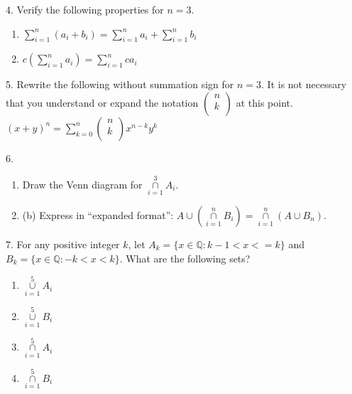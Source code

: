 \documentclass[10pt,]{book}
\theoremstyle{plain}
\theoremstyle{definition}
\begin{document}
\begin{exercisegroup}
\par\smallskip
\item[4.]\hypertarget{exercise-35}{}   Verify the following properties for \(n = 3\).   
\leavevmode%
\begin{enumerate}[label=(\alph*)]
\item\hypertarget{li-186}{}   \(\sum _{i=1}^n \left(a_i+ b_i\right) =\sum _{i=1}^n a_i +\sum _{i=1}^n  b_i\) \item\hypertarget{li-187}{}    \(c\left(\sum _{i=1}^n a_i\right) = \sum _{i=1}^n c a_i\)\end{enumerate}
\par\smallskip
\item[5.]\hypertarget{exercise-36}{} 
 Rewrite the following without summation sign for \(n = 3\). It is not necessary that you understand or expand the notation \(\left(
\begin{array}{c}
 n \\
 k \\
\end{array}
\right)\) at this point. 
  \((x + y)^n= \sum _{k=0}^n \left(
\begin{array}{c}
 n \\
 k \\
\end{array}
\right)x^{n-k}y^k\)\par\smallskip
\item[6.]\hypertarget{exercise-37}{}\leavevmode%
\begin{enumerate}[label=(\alph*)]
\item\hypertarget{li-188}{}  Draw the Venn diagram for \(\underset{i=1}{\overset{3}{\cap }}A_i\).\item\hypertarget{li-189}{} (b) Express in ``expanded format'': 
\(	A\cup (\underset{i=1}{\overset{n}{\cap }}B_i)= \underset{i=1}{\overset{n}{\cap }}(A \cup B_n)\).\end{enumerate}
\par\smallskip
\item[7.]\hypertarget{exercise-38}{} 
 For any positive integer \(k\), let \(A_k = \{x \in \mathbb{Q}:k-1 < x <= k\}\) and \(B_k = \{x \in \mathbb{Q}: -k < x < k\}\). What are
the following sets? 
\leavevmode%
\begin{enumerate}[label=(\alph*)]
\item\hypertarget{li-190}{}  \(\underset{i=1}{\overset{5}{\cup }}A_i\)\item\hypertarget{li-191}{}  \(\underset{i=1}{\overset{5}{\cup }}B_i\)\item\hypertarget{li-192}{}  \(\underset{i=1}{\overset{5}{\cap }}A_i\)\item\hypertarget{li-193}{}  \(\underset{i=1}{\overset{5}{\cap }}B_i\) \end{enumerate}

\end{exercisegroup}
\end{document}
